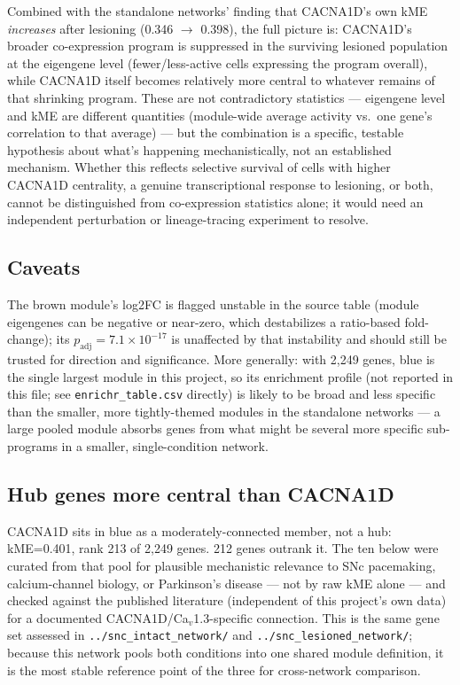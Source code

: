 \documentclass[11pt]{article}
\begin{document}
Combined with the standalone networks' finding that CACNA1D's own kME
\emph{increases} after lesioning (0.346 $\to$ 0.398), the full picture is:
CACNA1D's broader co-expression program is suppressed in the surviving
lesioned population at the eigengene level (fewer/less-active cells
expressing the program overall), while CACNA1D itself becomes relatively
more central to whatever remains of that shrinking program. These are not
contradictory statistics --- eigengene level and kME are different
quantities (module-wide average activity vs.\ one gene's correlation to
that average) --- but the combination is a specific, testable hypothesis
about what's happening mechanistically, not an established mechanism.
Whether this reflects selective survival of cells with higher CACNA1D
centrality, a genuine transcriptional response to lesioning, or both,
cannot be distinguished from co-expression statistics alone; it would need
an independent perturbation or lineage-tracing experiment to resolve.

\subsection*{Caveats}

The brown module's log2FC is flagged unstable in the source table (module
eigengenes can be negative or near-zero, which destabilizes a ratio-based
fold-change); its $p_{\mathrm{adj}}=7.1\times10^{-17}$ is unaffected by that
instability and should still be trusted for direction and significance.
More generally: with 2{,}249 genes, blue is the single largest module in
this project, so its enrichment profile (not reported in this file; see
\texttt{enrichr\_table.csv} directly) is likely to be broad and less
specific than the smaller, more tightly-themed modules in the standalone
networks --- a large pooled module absorbs genes from what might be several
more specific sub-programs in a smaller, single-condition network.

\subsection*{Hub genes more central than CACNA1D}

CACNA1D sits in blue as a moderately-connected member, not a hub: kME=0.401,
rank 213 of 2{,}249 genes. 212 genes outrank it. The ten below were curated
from that pool for plausible mechanistic relevance to SNc pacemaking,
calcium-channel biology, or Parkinson's disease --- not by raw kME alone ---
and checked against the published literature (independent of this project's
own data) for a documented CACNA1D/Ca$_v$1.3-specific connection. This is the
same gene set assessed in \texttt{../snc\_intact\_network/} and
\texttt{../snc\_lesioned\_network/}; because this network pools both
conditions into one shared module definition, it is the most stable
reference point of the three for cross-network comparison.
\end{document}
